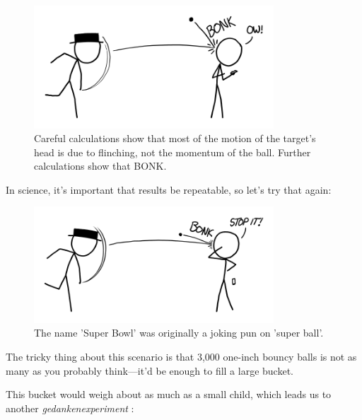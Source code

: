 {\begin{figure}[!htbp]
\centering
\includegraphics[scale=0.5, max width=0.8\textwidth]{imgs/a/52/bouncy_thought1.png}
\caption{Careful calculations show that most of the motion of the target's head is due to flinching, not the momentum of the ball. Further calculations show that BONK.}
\end{figure}

{In science, it's important that results be repeatable, so let's try that again:}

\begin{figure}[!htbp]
\centering
\includegraphics[scale=0.5, max width=0.8\textwidth]{imgs/a/52/bouncy_thought2.png}
\caption{The name 'Super Bowl' was originally a joking pun on 'super ball'.}
\end{figure}

{The tricky thing about this scenario is that 3,000 one-inch bouncy balls is not as many as you probably think—it'd be enough to fill a large bucket.}

{This bucket would weigh about as much as a small child, which leads us to another \emph{gedankenexperiment} :}

}
